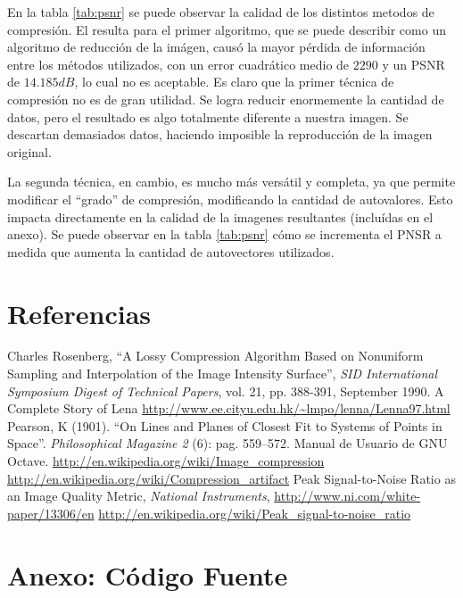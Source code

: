 \documentclass[twocolumn,a4paper,10pt]{article}
\begin{document}
En la tabla \ref{tab:psnr} se puede observar la calidad de los distintos metodos de compresión.
El resulta para el primer algoritmo, que se puede describir como un algoritmo de reducción de la imágen, causó la mayor pérdida de información entre los métodos utilizados, con un error cuadrático medio de $2290$ y un PSNR de $14.185 dB$, lo cual no es aceptable.
Es claro que la primer t\'ecnica de compresi\'on no es de gran utilidad. Se logra reducir enormemente la cantidad de datos, pero el resultado es algo
totalmente diferente a nuestra imagen. Se descartan demasiados datos, haciendo imposible la reproducci\'on de la imagen original.

La segunda t\'ecnica, en cambio, es mucho m\'as vers\'atil y completa, ya que permite modificar el ``grado'' de compresi\'on, modificando la cantidad de autovalores. 
Esto impacta directamente en la calidad de la imagenes resultantes (incluídas en el anexo). Se puede observar en la tabla \ref{tab:psnr} cómo se incrementa el PNSR a medida que aumenta la cantidad de autovectores utilizados.

\section*{Referencias}
\begin{thebibliography}{99}
    
    Charles Rosenberg, ``A Lossy Compression Algorithm Based on Nonuniform Sampling and Interpolation of the Image Intensity Surface'', \textit{SID International Symposium Digest of Technical Papers}, vol. 21, pp. 388-391, September 1990.
    A Complete Story of Lena \url{http://www.ee.cityu.edu.hk/~lmpo/lenna/Lenna97.html}
     Pearson, K (1901). ``On Lines and Planes of Closest Fit to Systems of Points in Space''. \textit{Philosophical Magazine 2} (6): pag. 559–572.
     Manual de Usuario de GNU Octave.
     \url{http://en.wikipedia.org/wiki/Image\_compression}
     \url{http://en.wikipedia.org/wiki/Compression\_artifact}
     Peak Signal-to-Noise Ratio as an Image Quality Metric, \textit{National Instruments}, \url{http://www.ni.com/white-paper/13306/en}
     \url{http://en.wikipedia.org/wiki/Peak_signal-to-noise_ratio}

\end{thebibliography}

\newpage
\section*{Anexo: Código Fuente}
    
    
    
\end{document}
